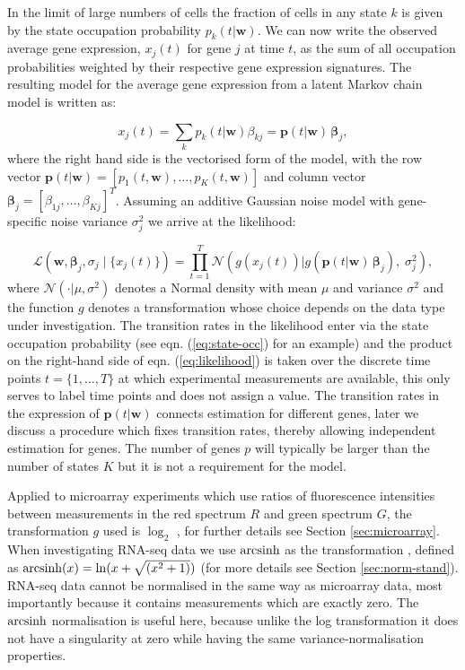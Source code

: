 In the limit of large numbers of cells the fraction of cells in any state $k$ is given by the state occupation probability $p_k(t|\mathbf{w})$. We can now write the observed average gene expression, $x_j(t)$ for gene $j$ at time $t$, as the sum of all occupation probabilities weighted by their respective gene expression signatures. The resulting model for the average gene expression from a latent Markov chain model is written as:

\begin{equation}
  x_j(t) = \sum_k p_k(t|\mathbf{w})\beta_{kj} = \mathbf{p}(t|\mathbf{w}) \, \boldsymbol\beta_j,
  \label{eq:model}
\end{equation}
where the right hand side is the vectorised form of the model, with the row vector $\mathbf{p}(t|\mathbf{w}) = [p_1(t,\mathbf{w}), \ldots , p_K(t,\mathbf{w})]$ and column vector $\boldsymbol\beta_j = [\beta_{1j}, \ldots , \beta_{Kj}]^T$. Assuming an additive Gaussian noise model with gene-specific noise variance $\sigma_j^2 $ we arrive at the likelihood:

\begin{equation}
  \label{eq:likelihood}
    \mathcal{L} \left(\mathbf{w}, \boldsymbol\beta_j, \sigma_j \;|\; \lbrace x_j(t)\rbrace\right) =
\prod_{t=1}^T \mathcal{N}\left(g(x_j(t)) | g\left(\mathbf{p}(t| \mathbf{w})\,\boldsymbol\beta_j\right),\; \sigma_j^2 \right),
\end{equation}
where $\mathcal{N}(\cdot | \mu,\sigma^2)$ denotes a Normal density with mean $\mu$ and variance $\sigma^2$ and the function $g$ denotes a transformation whose choice depends on the data type under investigation. The transition rates in the likelihood enter via the state occupation probability (see eqn. (\ref{eq:state-occ}) for an example) and the product on the right-hand side of eqn. (\ref{eq:likelihood}) is taken over the discrete time points $t=\{1, \ldots, T\}$ at which experimental measurements are available, this only serves to label time points and does not assign a value. The transition rates in the expression of $\mathbf{p}(t| \mathbf{w})$ connects estimation for different genes, later we discuss a procedure which fixes transition rates, thereby allowing independent estimation for genes. The number of genes $p$ will typically be larger than the number of states $K$ but it is not a requirement for the model.

Applied to microarray experiments which use ratios of fluorescence intensities between measurements in the red spectrum $R$ and green spectrum $G$, the transformation $g$ used is $\log_2$ \citep{Dudoit:2002va}, for further details see Section \ref{sec:microarray}. When investigating RNA-seq data we use $\operatorname{arcsinh}$ as the transformation \citep{Hoffman:2012gn,Johnson:1949uq}, defined as $\operatorname{arcsinh}(x) = \ln(x + \sqrt{(x^2 +1)})$ (for more details see Section \ref{sec:norm-stand}). RNA-seq data cannot be normalised in the same way as microarray data, most importantly because it contains measurements which are exactly zero. The $\operatorname{arcsinh}$ normalisation is useful here, because unlike the log transformation it does not have a singularity at zero while having the same variance-normalisation properties.

